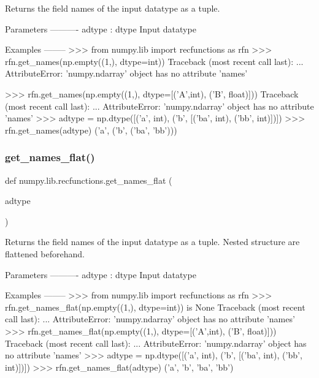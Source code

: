 \begin{DoxyVerb}Returns the field names of the input datatype as a tuple.

Parameters
----------
adtype : dtype
    Input datatype

Examples
--------
>>> from numpy.lib import recfunctions as rfn
>>> rfn.get_names(np.empty((1,), dtype=int))
Traceback (most recent call last):
    ...
AttributeError: 'numpy.ndarray' object has no attribute 'names'

>>> rfn.get_names(np.empty((1,), dtype=[('A',int), ('B', float)]))
Traceback (most recent call last):
    ...
AttributeError: 'numpy.ndarray' object has no attribute 'names'
>>> adtype = np.dtype([('a', int), ('b', [('ba', int), ('bb', int)])])
>>> rfn.get_names(adtype)
('a', ('b', ('ba', 'bb')))
\end{DoxyVerb}
 \mbox{\label{namespacenumpy_1_1lib_1_1recfunctions_ab5cfcf21f7e88a2c1d3ba135e1b4dd78}} 
\subsubsection{\texorpdfstring{get\+\_\+names\+\_\+flat()}{get\_names\_flat()}}
{\footnotesize\ttfamily def numpy.\+lib.\+recfunctions.\+get\+\_\+names\+\_\+flat (\begin{DoxyParamCaption}\item[{}]{adtype }\end{DoxyParamCaption})}

\begin{DoxyVerb}Returns the field names of the input datatype as a tuple. Nested structure
are flattened beforehand.

Parameters
----------
adtype : dtype
    Input datatype

Examples
--------
>>> from numpy.lib import recfunctions as rfn
>>> rfn.get_names_flat(np.empty((1,), dtype=int)) is None
Traceback (most recent call last):
    ...
AttributeError: 'numpy.ndarray' object has no attribute 'names'
>>> rfn.get_names_flat(np.empty((1,), dtype=[('A',int), ('B', float)]))
Traceback (most recent call last):
    ...
AttributeError: 'numpy.ndarray' object has no attribute 'names'
>>> adtype = np.dtype([('a', int), ('b', [('ba', int), ('bb', int)])])
>>> rfn.get_names_flat(adtype)
('a', 'b', 'ba', 'bb')
\end{DoxyVerb}
 \mbox{\label{namespacenumpy_1_1lib_1_1recfunctions_a71d156563fd708ee8342cd1ed16d44ae}} 
